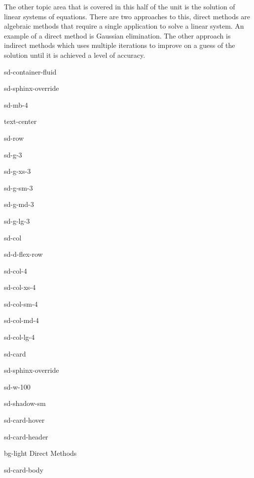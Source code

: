 \documentclass[letterpaper,10pt,english]{jupyterBook}
\begin{document}
\sphinxAtStartPar
The other topic area that is covered in this half of the unit is the solution of linear systems of equations. There are two approaches to this, direct methods are algebraic methods that require a single application to solve a linear system. An example of a direct method is Gaussian elimination. The other approach is indirect methods which uses multiple iterations to improve on a guess of the solution until it is achieved a level of accuracy.

\begin{sphinxuseclass}{sd-container-fluid}
\begin{sphinxuseclass}{sd-sphinx-override}
\begin{sphinxuseclass}{sd-mb-4}
\begin{sphinxuseclass}{text-center}
\begin{sphinxuseclass}{sd-row}
\begin{sphinxuseclass}{sd-g-3}
\begin{sphinxuseclass}{sd-g-xs-3}
\begin{sphinxuseclass}{sd-g-sm-3}
\begin{sphinxuseclass}{sd-g-md-3}
\begin{sphinxuseclass}{sd-g-lg-3}
\begin{sphinxuseclass}{sd-col}
\begin{sphinxuseclass}{sd-d-flex-row}
\begin{sphinxuseclass}{sd-col-4}
\begin{sphinxuseclass}{sd-col-xs-4}
\begin{sphinxuseclass}{sd-col-sm-4}
\begin{sphinxuseclass}{sd-col-md-4}
\begin{sphinxuseclass}{sd-col-lg-4}
\begin{sphinxuseclass}{sd-card}
\begin{sphinxuseclass}{sd-sphinx-override}
\begin{sphinxuseclass}{sd-w-100}
\begin{sphinxuseclass}{sd-shadow-sm}
\begin{sphinxuseclass}{sd-card-hover}
\begin{sphinxuseclass}{sd-card-header}
\begin{sphinxuseclass}{bg-light}
\sphinxAtStartPar
Direct Methods

\end{sphinxuseclass}
\end{sphinxuseclass}
\begin{sphinxuseclass}{sd-card-body}
\begin{figure}[htbp]
\centering


\end{figure}
\end{sphinxuseclass}
\end{sphinxuseclass}
\end{sphinxuseclass}
\end{sphinxuseclass}
\end{sphinxuseclass}
\end{sphinxuseclass}
\end{sphinxuseclass}
\end{sphinxuseclass}
\end{sphinxuseclass}
\end{sphinxuseclass}
\end{sphinxuseclass}
\end{sphinxuseclass}
\end{sphinxuseclass}
\end{sphinxuseclass}
\end{sphinxuseclass}
\end{sphinxuseclass}
\end{sphinxuseclass}
\end{sphinxuseclass}
\end{sphinxuseclass}
\end{sphinxuseclass}
\end{sphinxuseclass}
\end{sphinxuseclass}
\end{sphinxuseclass}
\end{document}
